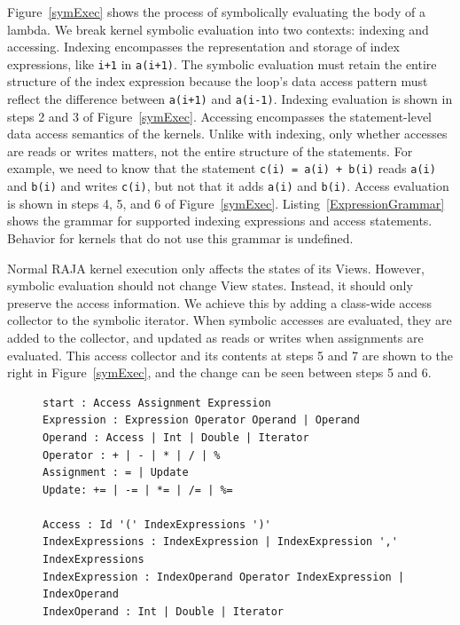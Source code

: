 \documentclass{article}
\begin{document}
Figure~\ref{symExec} shows the process of symbolically evaluating the body of a lambda. 
We break kernel symbolic evaluation into two contexts: indexing and accessing. 
Indexing encompasses the representation and storage of index expressions, like
\verb.i+1. in \verb.a(i+1)..
The symbolic evaluation must retain the entire structure of the index expression 
because the loop's
data access pattern must reflect the difference between \verb.a(i+1). and
\verb.a(i-1)..
Indexing evaluation is shown in steps 2 and 3 of Figure~\ref{symExec}.
Accessing encompasses the statement-level data access semantics of the kernels.
Unlike with indexing, only whether accesses are reads or writes matters,
not the entire structure of the statements.
For example, we need to know that the statement \verb.c(i) = a(i) + b(i).
reads \verb.a(i). and \verb.b(i). and writes \verb.c(i)., but not that it
adds \verb.a(i). and \verb.b(i)..
Access evaluation is shown in steps 4, 5, and 6 of Figure~\ref{symExec}.
Listing~\ref{ExpressionGrammar} shows the grammar for supported indexing expressions and access statements. 
Behavior for kernels that do not use this grammar is undefined.

Normal RAJA kernel execution only affects the states of its Views. 
However, symbolic evaluation should not change View states. 
Instead, it should only preserve the access information.
We achieve this by adding a class-wide access collector to the symbolic iterator. 
When symbolic accesses are evaluated, they are added to the collector, and updated as reads or writes when assignments are evaluated.
This access collector and its contents at steps 5 and 7 are shown to the right in Figure~\ref{symExec}, and the change can be seen between steps 5 and 6.
 
\begin{figure}[t]
\begin{lstlisting}[label={ExpressionGrammar},caption={EBNF Grammar to Support Symbolic Evaluation}]
start : Access Assignment Expression
Expression : Expression Operator Operand | Operand
Operand : Access | Int | Double | Iterator
Operator : + | - | * | / | %
Assignment : = | Update
Update: += | -= | *= | /= | %=

Access : Id '(' IndexExpressions ')'
IndexExpressions : IndexExpression | IndexExpression ',' IndexExpressions
IndexExpression : IndexOperand Operator IndexExpression | IndexOperand
IndexOperand : Int | Double | Iterator
\end{lstlisting}
\end{figure}
\end{document}
